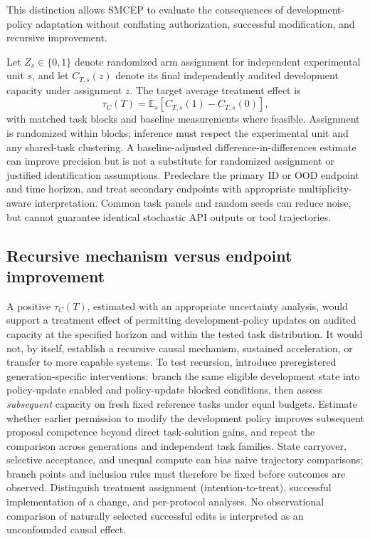 \documentclass[11pt,a4paper]{article}
\begin{document}
This distinction allows SMCEP to evaluate the consequences of development-policy adaptation without conflating authorization, successful modification, and recursive improvement.

Let \(Z_s\in\{0,1\}\) denote randomized arm assignment for independent experimental unit \(s\), and let \(C_{T,s}(z)\) denote its final independently audited development capacity under assignment \(z\). The target average treatment effect is
\begin{equation}
\tau_C(T)=\mathbb E_s\left[C_{T,s}(1)-C_{T,s}(0)\right],\label{eq:ate}
\end{equation}
with matched task blocks and baseline measurements where feasible. Assignment is randomized within blocks; inference must respect the experimental unit and any shared-task clustering. A baseline-adjusted difference-in-differences estimate can improve precision but is not a substitute for randomized assignment or justified identification assumptions. Predeclare the primary ID or OOD endpoint and time horizon, and treat secondary endpoints with appropriate multiplicity-aware interpretation. Common task panels and random seeds can reduce noise, but cannot guarantee identical stochastic API outputs or tool trajectories.

\subsection{Recursive mechanism versus endpoint improvement}
A positive \(\tau_C(T)\), estimated with an appropriate uncertainty analysis, would support a treatment effect of permitting development-policy updates on audited capacity at the specified horizon and within the tested task distribution. It would not, by itself, establish a recursive causal mechanism, sustained acceleration, or transfer to more capable systems. To test recursion, introduce preregistered generation-specific interventions: branch the same eligible development state into policy-update enabled and policy-update blocked conditions, then assess \emph{subsequent} capacity on fresh fixed reference tasks under equal budgets. Estimate whether earlier permission to modify
the development policy improves subsequent proposal competence beyond direct task-solution
gains, and repeat the comparison across generations and independent task families. State carryover, selective acceptance, and unequal compute can bias naive trajectory comparisons; branch points and inclusion rules must therefore be fixed before outcomes are observed. Distinguish treatment assignment (intention-to-treat), successful implementation of a change, and per-protocol analyses. No observational comparison of naturally selected successful edits is interpreted as an unconfounded causal effect.
\end{document}
